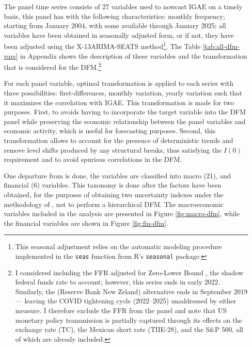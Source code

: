\documentclass[12pt]{article}
\begin{document}
The \cite{corona2022timely} panel time series consists of 27 variables used to nowcast IGAE on a timely basis, this panel has with the following characteristics: monthly frequency; starting from January 2004, with some available through January 2025; all variables have been obtained in seasonally adjusted form, or  if not, they have been adjusted using the X-13ARIMA-SEATS method\footnote{This seasonal adjustment relies on the automatic modeling procedure implemented in the \texttt{seas} function from R’s  \texttt{seasonal} package.}. The Table \ref{tab:all-dfm-vars} in Appendix shows the description of these variables and the transformation that is considered for the DFM.\footnote{I considered including the FFR adjusted for Zero-Lower Bound \citep{wu2016measuring}, the shadow federal funds rate to account; however, this series ends in early 2022. Similarly, the \cite{krippner2013measuring} (Reserve Bank New Zeland) alternative ends in September 2019 — leaving the COVID tightening cycle (2022–2025) unaddressed by either measure. I therefore exclude the FFR from the panel and note that US monetary policy transmission is partially captured through its effects on the exchange rate (TC), the Mexican short rate (TIIE-28), and the S\&P 500, all of which are already included.}


For each panel variable, optimal transformation is applied to each series with three possibilities: first-differences, monthly variation, yearly variation such that it maximizes the correlation with IGAE. This transformation is made for two purposes. First, to avoids having to incorporate the target variable into the DFM panel while preserving the economic relationship between the panel variables and economic activity, which is useful for forecasting purposes. Second, this transformation allows to account for the presence of deterministic trends and remove level shifts produced by any structural breaks, thus satisfying the $I(0)$ requirement and  to avoid spurious correlations in the DFM.  

One departure from \cite{corona2022timely} is done, the variables are classified into macro (21), and financial (6) variables. This taxonomy is done after the factors have been obtained, for the purposes of obtaining two uncertainty indexes under the methodology of \cite{jurado2015measuring}, not to perform a hierarchical DFM. The macroeconomic variables included in the analysis are presented in Figure \ref{fig:macro-dfm}, while the financial variables are shown in Figure \ref{fig:fin-dfm}.
\end{document}
